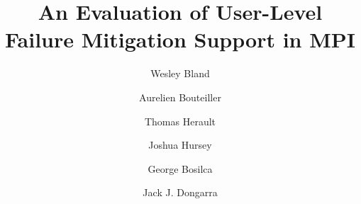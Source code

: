 \documentclass{llncs}
\begin{document}
\title{An Evaluation of User-Level Failure Mitigation Support in MPI}
\author{ Wesley Bland \and
               Aurelien Bouteiller \and
               Thomas Herault \and
                Joshua Hursey \and
                George Bosilca \and
                Jack J. Dongarra}
\maketitle









\pagebreak

\newcommand{\BIBdecl}{\setlength{\itemsep}{0.03\baselineskip}} 


\end{document}
